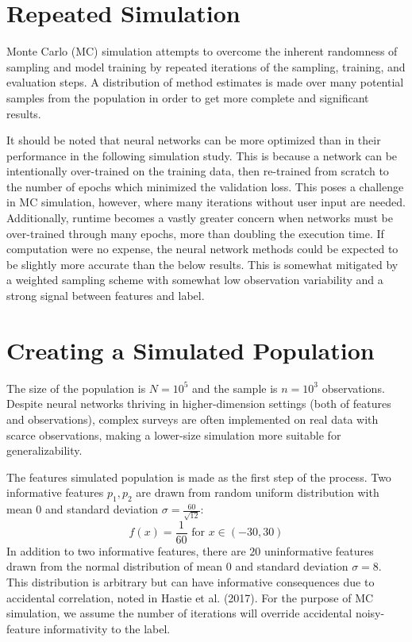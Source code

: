 \documentclass[12pt,twoside]{reedthesis}
\begin{document}
\section{Repeated Simulation}\label{repeated-simulation}

Monte Carlo (MC) simulation attempts to overcome the inherent randomness
of sampling and model training by repeated iterations of the sampling,
training, and evaluation steps. A distribution of method estimates is
made over many potential samples from the population in order to get
more complete and significant results.

It should be noted that neural networks can be more optimized than in
their performance in the following simulation study. This is because a
network can be intentionally over-trained on the training data, then
re-trained from scratch to the number of epochs which minimized the
validation loss. This poses a challenge in MC simulation, however, where
many iterations without user input are needed. Additionally, runtime
becomes a vastly greater concern when networks must be over-trained
through many epochs, more than doubling the execution time. If
computation were no expense, the neural network methods could be
expected to be slightly more accurate than the below results. This is
somewhat mitigated by a weighted sampling scheme with somewhat low
observation variability and a strong signal between features and label.

\section{Creating a Simulated
Population}\label{creating-a-simulated-population}

The size of the population is \(N=10^5\) and the sample is \(n=10^3\)
observations. Despite neural networks thriving in higher-dimension
settings (both of features and observations), complex surveys are often
implemented on real data with scarce observations, making a lower-size
simulation more suitable for generalizability.

The features simulated population is made as the first step of the
process. Two informative features \(p_1, p_2\) are drawn from random
uniform distribution with mean \(0\) and standard deviation
\(\sigma = \frac{60}{\sqrt{12}}\): \[
f(x) = \frac{1}{60} \text{ for } x \in (-30, 30)
\] In addition to two informative features, there are \(20\)
uninformative features drawn from the normal distribution of mean \(0\)
and standard deviation \(\sigma = 8\). This distribution is arbitrary
but can have informative consequences due to accidental correlation,
noted in Hastie et al. (2017). For the purpose of MC simulation, we
assume the number of iterations will override accidental noisy-feature
informativity to the label.
\end{document}
